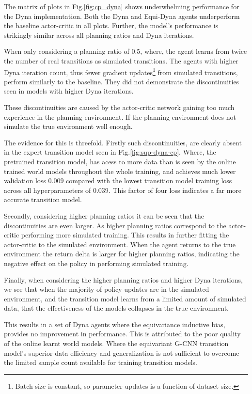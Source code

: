 The matrix of plots in Fig.\ref{fig:cp_dyna} shows underwhelming performance for the Dyna implementation. Both the Dyna and Equi-Dyna agents underperform the baseline actor-critic in all plots. Further, the model's performance is strikingly similar across all planning ratios and Dyna iterations.

When only considering a planning ratio of 0.5, where, the agent learns from twice the number of real transitions as simulated transitions. The agents with higher Dyna iteration count, thus fewer gradient updates\footnote{Batch size is constant, so parameter updates is a function of dataset size.} from simulated transitions, perform similarly to the baseline. They did not demonstrate the discontinuities seen in models with higher Dyna iterations.

These discontinuities are caused by the actor-critic network gaining too much experience in the planning environment. If the planning environment does not simulate the true environment well enough.

The evidence for this is threefold. Firstly such discontinuities, are clearly absent in the expert transition model seen in Fig.\ref{fig:sup-dyna-cp}. Where, the pretrained transition model, has acess to more data than is seen by the online trained world models throughout the whole training, and achieves much lower validation loss $0.009$ compared with the lowest transition model training loss across all hyperparameters of $0.039$. This factor of four loss indicates a far more accurate transition model.

Secondly, considering higher planning ratios it can be seen that the discontinuities are even larger. As higher planning ratios correspond to the actor-critic performing more simulated training. This results in further fitting the actor-critic to the simulated environment. When the agent returns to the true environment the return delta is larger for higher planning ratios, indicating the negative effect on the policy in performing simulated training.

Finally, when considering the higher planning ratios and higher Dyna iterations, we see that when the majority of policy updates are in the simulated environment, and the transition model learns from a limited amount of simulated data, that the effectiveness of the models collapses in the true environment.

This results in a set of Dyna agents where the equivariance inductive bias, provides no improvement in performance. This is attributed to the poor quality of the online learnt world models. Where the equivariant G-CNN transition model's superior data efficiency and generalization is not sufficient to overcome the limited sample count available for training transition models.

